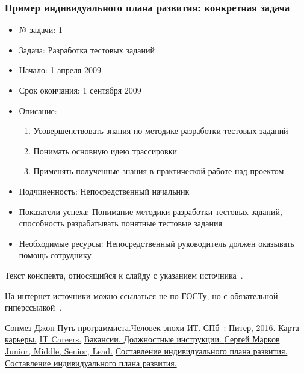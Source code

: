 \documentclass{../industrial-development}
\begin{document}
\begin{frame} \frametitle{Пример индивидуального плана развития: конкретная задача }

\begin{itemize}
  \item № задачи: 1
  \item Задача: Разработка тестовых заданий
 \item Начало: 1 апреля 2009 
  \item Срок окончания: 1 сентября 2009 
  \item Описание: \begin{enumerate}
 \item Усовершенствовать знания по методике разработки тестовых заданий
\item Понимать основную идею трассировки
\item Применять полученные знания в практической работе над проектом
  \end{enumerate}
  \item Подчиненность: Непосредственный начальник
  \item Показатели успеха: Понимание методики разработки тестовых заданий, способность разрабатывать понятные тестовые задания
  \item Необходимые ресурсы: Непосредственный руководитель должен оказывать помощь сотруднику
  \end{itemize}



\end{frame}

\lecturenotes

Текст конспекта, относящийся к слайду с указанием источника~\cite[с.~97--99]{Brooks}.

На интернет-источники можно ссылаться не по ГОСТу, но с обязательной гиперссылкой~\cite{Fowler}.

\begin{thebibliography}{99}
 Сонмез Джон Путь программиста.Человек эпохи ИТ. СПб~: Питер, 2016.
 \href{https://dou.ua/lenta/columns/karta-kariery/?from=foo}{ Карта карьеры.}
 \href{https://www.itcareerfinder.com/it-careers.html}{ IT Careers.}
 \href{https://hh.ru}{ Вакансии. }
 \href{https://www.rabotka.ru/job_description/}{ Должностные инструкции. }
 \href{http://www.dataart.ru/news/junior-middle-senior-lead-etc-v-chem-raznitsa/}{ Сергей Марков Junior, Middle, Senior, Lead.}
 \href{http://www.e-reading.club/chapter.php/1050422/98/Beron_-_Upravlenie_rezultativnostyu.html}{ Составление индивидуального плана развития.}
 \href{http://www.sbsc.ru/books/TalentWarBook.pdf}{ Составление индивидуального плана развития.}
\end{thebibliography}
\end{document}
